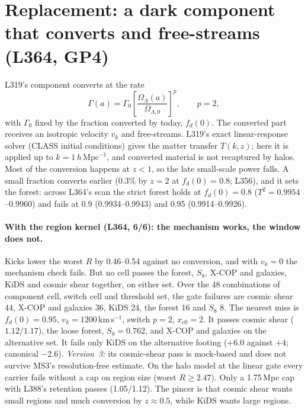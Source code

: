 \documentclass[10pt]{article}
\newcommand{\hMpc}{\,h\,\mathrm{Mpc}^{-1}}
\begin{document}
\section{Replacement: a dark component that converts and free-streams (L364, GP4)}\label{sec:replace}

L319's component converts at the rate
\begin{equation}
\Gamma(a)=\Gamma_0\left[\frac{\Omega_\Lambda(a)}{\Omega_{\Lambda,0}}\right]^p ,\qquad p=2,
\end{equation}
with $\Gamma_0$ fixed by the fraction converted by today, $f_d(0)$. The converted part receives an isotropic velocity $v_k$ and free-streams. L319's exact linear-response solver (CLASS initial conditions) gives the matter transfer $T(k,z)$; here it is applied up to $k=1\hMpc$, and converted material is not recaptured by halos. Most of the conversion happens at $z<1$, so the late small-scale power falls. A small fraction converts earlier (0.3\% by $z=2$ at $f_d(0)=0.8$; L356), and it sets the forest: across L364's scan the strict forest holds at $f_d(0)=0.8$ ($T^2=0.9954$--0.9960) and fails at 0.9 (0.9934--0.9943) and 0.95 (0.9914--0.9926).

\paragraph{With the region kernel (L364, 6/6): the mechanism works, the window does not.} Kicks lower the worst $R$ by 0.46--0.54 against no conversion, and with $v_k=0$ the mechanism check fails. But no cell passes the forest, $S_8$, X-COP and galaxies, KiDS and cosmic shear together, on either set. Over the 48 combinations of component cell, switch cell and threshold set, the gate failures are cosmic shear 44, X-COP and galaxies 36, KiDS 24, the forest 16 and $S_8$ 8. The nearest miss is $f_d(0)=0.95$, $v_k=1200$\,km\,s$^{-1}$, switch $p=2$, $x_{c0}=2$. It passes cosmic shear ($1.12/1.17$), the loose forest, $S_8=0.762$, and X-COP and galaxies on the alternative set. It fails only KiDS on the alternative footing ($+6.0$ against $+4$; canonical $-2.6$). \emph{Version~3:} its cosmic-shear pass is mock-based and does not survive MS3's resolution-free estimate. On the halo model at the linear gate every carrier fails without a cap on region size (worst $R\geq2.47$). Only a 1.75\,Mpc cap with L388's retention passes (1.05/1.12). The pincer is that cosmic shear wants small regions and much conversion by $z\approx0.5$, while KiDS wants large regions.
\end{document}
